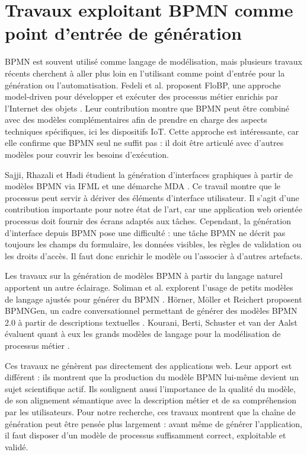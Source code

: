 \documentclass[12pt,a4paper]{article}
\begin{document}
\section{Travaux exploitant BPMN comme point d'entrée de génération}

BPMN est souvent utilisé comme langage de modélisation, mais plusieurs travaux récents cherchent à aller plus loin en l'utilisant comme point d'entrée pour la génération ou l'automatisation. Fedeli et al. proposent FloBP, une approche model-driven pour développer et exécuter des processus métier enrichis par l'Internet des objets \cite{fedeli2024}. Leur contribution montre que BPMN peut être combiné avec des modèles complémentaires afin de prendre en charge des aspects techniques spécifiques, ici les dispositifs IoT. Cette approche est intéressante, car elle confirme que BPMN seul ne suffit pas : il doit être articulé avec d'autres modèles pour couvrir les besoins d'exécution.

Sajji, Rhazali et Hadi étudient la génération d'interfaces graphiques à partir de modèles BPMN via IFML et une démarche MDA \cite{sajji2023}. Ce travail montre que le processus peut servir à dériver des éléments d'interface utilisateur. Il s'agit d'une contribution importante pour notre état de l'art, car une application web orientée processus doit fournir des écrans adaptés aux tâches. Cependant, la génération d'interface depuis BPMN pose une difficulté : une tâche BPMN ne décrit pas toujours les champs du formulaire, les données visibles, les règles de validation ou les droits d'accès. Il faut donc enrichir le modèle ou l'associer à d'autres artefacts.

Les travaux sur la génération de modèles BPMN à partir du langage naturel apportent un autre éclairage. Soliman et al. explorent l'usage de petits modèles de langage ajustés pour générer du BPMN \cite{soliman2025}. Hörner, Möller et Reichert proposent BPMNGen, un cadre conversationnel permettant de générer des modèles BPMN 2.0 à partir de descriptions textuelles \cite{horner2026}. Kourani, Berti, Schuster et van der Aalst évaluent quant à eux les grands modèles de langage pour la modélisation de processus métier \cite{kourani2025}.

Ces travaux ne génèrent pas directement des applications web. Leur apport est différent : ils montrent que la production du modèle BPMN lui-même devient un sujet scientifique actif. Ils soulignent aussi l'importance de la qualité du modèle, de son alignement sémantique avec la description métier et de sa compréhension par les utilisateurs. Pour notre recherche, ces travaux montrent que la chaîne de génération peut être pensée plus largement : avant même de générer l'application, il faut disposer d'un modèle de processus suffisamment correct, exploitable et validé.
\end{document}
